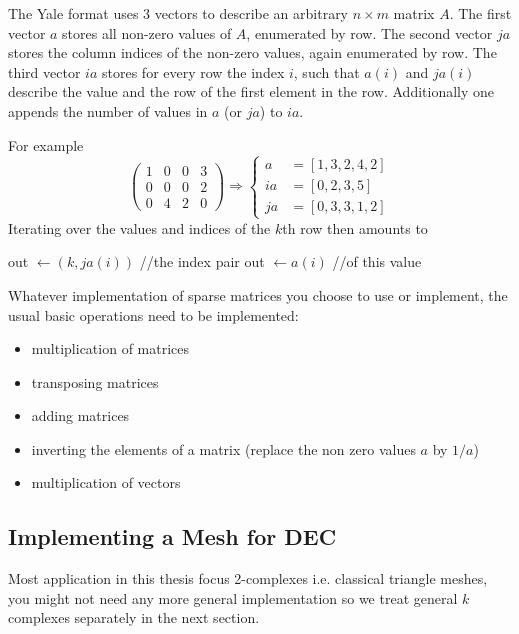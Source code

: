 The Yale format uses 3 vectors to describe an arbitrary $n\times m$ matrix $A$. The first vector $a$ stores all non-zero values of $A$, enumerated by row. The second vector $ja$ stores the column indices of the non-zero values, again enumerated by row. The third vector $ia$ stores for every row the index $i$, such that $a(i)$ and $ja(i)$ describe the value and the row of the first element in the row. Additionally one appends the number of values in $a$ (or $ja$) to $ia$.

For example 
\[\begin{pmatrix}
1 & 0 & 0 &3 \\
 0 & 0 & 0 &2 \\
 0 & 4&2&0
\end{pmatrix} \Rightarrow \begin{cases} a &= [1,3,2,4,2] \\ ia &= [0,2,3,5]  \\ ja &= [0,3,3,1,2]\end{cases}\]
Iterating over the values and indices of the $k$th row then amounts to
\begin{algorithmic}
	\STATE out $\gets (k,ja(i))$   //the index pair
	\STATE out $\gets a(i)$  //of this value
\ENDFOR
\end{algorithmic}

Whatever implementation of sparse matrices you choose to use or implement, the usual basic operations need to be implemented:
\begin{itemize}
\item multiplication of matrices
\item transposing matrices
\item adding matrices
\item inverting the elements of a matrix (replace the non zero values $a$ by $1/a$)
\item multiplication of vectors
\end{itemize}

\subsection{Implementing a Mesh for DEC}
\label{sec::2_handsOnSimplicialComplexes}
Most application in this thesis focus 2-complexes i.e. classical triangle meshes, you might not need any more general implementation so we treat general $k$ complexes separately in the next section. 

